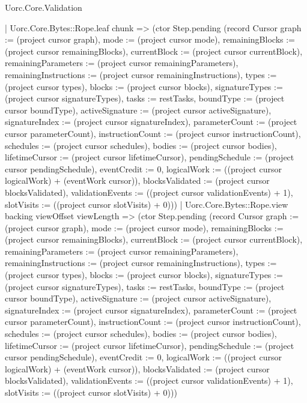 \begin{lexlean}{Uorc.Core.Validation}
\begin{semanticmodule}
{          | Uorc.Core.Bytes::Rope.leaf chunk => (ctor Step.pending (record Cursor {graph := (project cursor graph), mode := (project cursor mode), remainingBlocks := (project cursor remainingBlocks), currentBlock := (project cursor currentBlock), remainingParameters := (project cursor remainingParameters), remainingInstructions := (project cursor remainingInstructions), types := (project cursor types), blocks := (project cursor blocks), signatureTypes := (project cursor signatureTypes), tasks := restTasks, boundType := (project cursor boundType), activeSignature := (project cursor activeSignature), signatureIndex := (project cursor signatureIndex), parameterCount := (project cursor parameterCount), instructionCount := (project cursor instructionCount), schedules := (project cursor schedules), bodies := (project cursor bodies), lifetimeCursor := (project cursor lifetimeCursor), pendingSchedule := (project cursor pendingSchedule), eventCredit := 0, logicalWork := ((project cursor logicalWork) + (eventWork cursor)), blocksValidated := (project cursor blocksValidated), validationEvents := ((project cursor validationEvents) + 1), slotVisits := ((project cursor slotVisits) + 0)}))
          | Uorc.Core.Bytes::Rope.view backing viewOffset viewLength => (ctor Step.pending (record Cursor {graph := (project cursor graph), mode := (project cursor mode), remainingBlocks := (project cursor remainingBlocks), currentBlock := (project cursor currentBlock), remainingParameters := (project cursor remainingParameters), remainingInstructions := (project cursor remainingInstructions), types := (project cursor types), blocks := (project cursor blocks), signatureTypes := (project cursor signatureTypes), tasks := restTasks, boundType := (project cursor boundType), activeSignature := (project cursor activeSignature), signatureIndex := (project cursor signatureIndex), parameterCount := (project cursor parameterCount), instructionCount := (project cursor instructionCount), schedules := (project cursor schedules), bodies := (project cursor bodies), lifetimeCursor := (project cursor lifetimeCursor), pendingSchedule := (project cursor pendingSchedule), eventCredit := 0, logicalWork := ((project cursor logicalWork) + (eventWork cursor)), blocksValidated := (project cursor blocksValidated), validationEvents := ((project cursor validationEvents) + 1), slotVisits := ((project cursor slotVisits) + 0)}))
}
\end{semanticmodule}
\end{lexlean}
